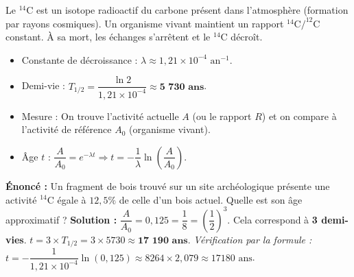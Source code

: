 \documentclass[11pt]{article}
\begin{document}
\begin{exemplebox}
Le $^{14}\text{C}$ est un isotope radioactif du carbone présent dans l'atmosphère (formation par rayons cosmiques). Un organisme vivant maintient un rapport $^{14}\text{C}/^{12}\text{C}$ constant. À sa mort, les échanges s'arrêtent et le $^{14}\text{C}$ décroît.
\begin{itemize}
    \item Constante de décroissance : $\lambda \approx 1,21 \times 10^{-4} \text{ an}^{-1}$.
    \item Demi-vie : $T_{1/2} = \dfrac{\ln 2}{1,21 \times 10^{-4}} \approx \textbf{5 730 ans}$.
    \item Mesure : On trouve l'activité actuelle $A$ (ou le rapport $R$) et on compare à l'activité de référence $A_0$ (organisme vivant).
    \item Âge $t$ : $\dfrac{A}{A_0} = e^{-\lambda t} \Rightarrow t = -\dfrac{1}{\lambda} \ln\left(\dfrac{A}{A_0}\right)$.
\end{itemize}
\end{exemplebox}

\begin{exoresolu}
\textbf{Énoncé :} Un fragment de bois trouvé sur un site archéologique présente une activité $^{14}\text{C}$ égale à $12,5\%$ de celle d'un bois actuel. Quelle est son âge approximatif ?
\tcblower
\textbf{Solution :}
$\dfrac{A}{A_0} = 0,125 = \dfrac{1}{8} = \left(\dfrac{1}{2}\right)^3$.
Cela correspond à \textbf{3 demi-vies}.
$t = 3 \times T_{1/2} = 3 \times 5730 \approx \textbf{17 190 ans}$.
\textit{Vérification par la formule :} $t = -\dfrac{1}{1,21\times 10^{-4}} \ln(0,125) \approx 8264 \times 2,079 \approx 17 180 \text{ ans}$.
\end{exoresolu}
\end{document}
